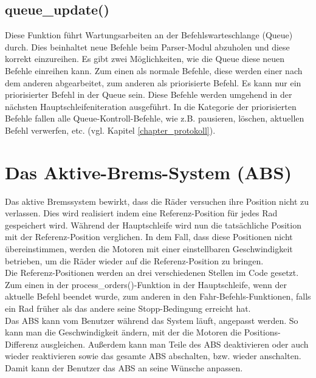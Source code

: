 \subsection{queue\_update()\label{chapter_queue_update}}
Diese Funktion führt Wartungsarbeiten an der Befehlswarteschlange (Queue) durch. Dies beinhaltet neue
Befehle beim Parser-Modul abzuholen und diese korrekt einzureihen. Es gibt zwei Möglichkeiten, wie die Queue
diese neuen Befehle einreihen kann. Zum einen als normale Befehle, diese werden einer nach dem anderen abgearbeitet,
zum anderen als priorisierte Befehl. Es kann nur ein priorisierter Befehl in der Queue sein. Diese Befehle werden
umgehend in der nächsten Haupt\-schleifen\-iteration ausgeführt. In die Kategorie der priorisierten Befehle fallen
alle Queue-Kontroll-Befehle, wie z.B. pausieren, löschen, aktuellen Befehl verwerfen, etc. (vgl. Kapitel \ref{chapter_protokoll}).

\section{Das Aktive-Brems-System (ABS)\label{chapter_abs}}
Das aktive Bremssystem bewirkt, dass die Räder versuchen ihre Position nicht zu verlassen. Dies wird realisiert indem
eine Referenz-Position für jedes Rad gespeichert wird. Während der Hauptschleife wird nun die tatsächliche Position mit
der Referenz-Position verglichen. In dem Fall, dass diese Positionen nicht übereinstimmen, werden die Motoren mit einer
einstellbaren Geschwindigkeit betrieben, um die Räder wieder auf die Referenz-Position zu bringen.\\
Die Referenz-Positionen werden an drei verschiedenen Stellen im Code gesetzt. Zum einen in der process\_\-orders()-Funktion
in der Hauptschleife, wenn der aktuelle Befehl beendet wurde, zum anderen in den Fahr-Befehls-Funktionen, falls ein Rad
früher als das andere seine Stopp-Bedingung erreicht hat.\\
Das ABS kann vom Benutzer während das System läuft, angepasst werden. So kann man die Geschwindigkeit ändern, mit der
die Motoren die Positions-Differenz ausgleichen. Außerdem kann man Teile des ABS deaktivieren oder auch wieder reaktivieren
sowie das gesamte ABS abschalten, bzw. wieder anschalten. Damit kann der Benutzer das ABS an seine Wünsche anpassen.


